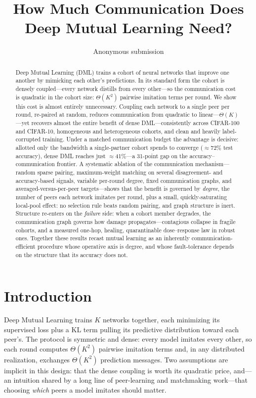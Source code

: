 \documentclass[10pt,twocolumn]{article}
\title{\bf How Much Communication Does Deep Mutual Learning Need?}
\author{Anonymous submission}
\date{}
\begin{document}
\maketitle

\begin{abstract}
Deep Mutual Learning (DML) trains a cohort of neural networks that improve one
another by mimicking each other's predictions. In its standard form the cohort
is densely coupled---every network distills from every other---so the
communication cost is quadratic in the cohort size: $\Theta(K^2)$ pairwise
imitation terms per round. We show this cost is almost entirely unnecessary.
Coupling each network to a single peer per round, re-paired at random, reduces
communication from quadratic to linear---$\Theta(K)$---yet recovers almost the
entire benefit of dense DML---consistently across CIFAR-100 and CIFAR-10,
homogeneous and heterogeneous cohorts, and clean and heavily label-corrupted
training.
Under a matched communication budget the advantage is decisive: allotted only
the bandwidth a single-partner cohort spends to converge ($\approx$72\% test
accuracy), dense DML reaches just $\approx$41\%---a 31-point gap on the
accuracy--communication frontier. A systematic ablation of the communication
mechanism---random sparse pairing, maximum-weight matching on several
disagreement- and accuracy-based signals, variable per-round degree, fixed
communication graphs, and averaged-versus-per-peer targets---shows that the
benefit is governed by \emph{degree}, the number of peers each network imitates
per round, plus a small, quickly-saturating local-pool effect: no selection
rule beats random pairing, and graph structure is inert. Structure re-enters
on the \emph{failure} side: when a cohort member degrades, the communication
graph governs how damage propagates---contagious collapse in fragile cohorts,
and a measured one-hop, healing, quarantinable dose--response law in robust
ones. Together these results recast mutual learning as an inherently
communication-efficient procedure whose operative axis is degree, and whose
fault-tolerance depends on the structure that its accuracy does not.
\end{abstract}

\section{Introduction}

Deep Mutual Learning \citep{zhang2018deep} trains $K$ networks together, each
minimizing its supervised loss plus a KL term pulling its predictive
distribution toward each peer's. The protocol is symmetric and dense: every
model imitates every other, so each round computes $\Theta(K^2)$ pairwise
imitation terms and, in any distributed realization, exchanges $\Theta(K^2)$
prediction messages. Two assumptions are implicit in this design: that the
dense coupling is worth its quadratic price, and---an intuition shared by a
long line of peer-learning and matchmaking work---that choosing \emph{which}
peers a model imitates should matter.
\end{document}
